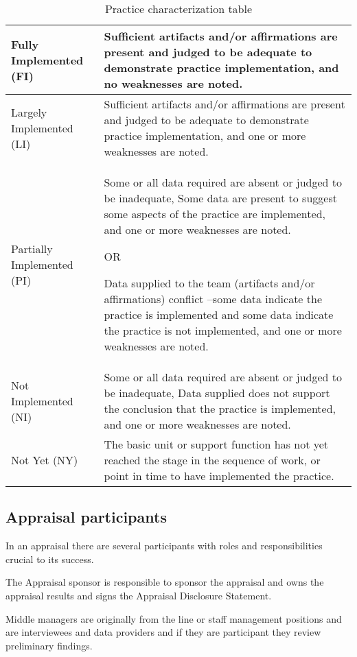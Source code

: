 \begin{table}[h]
	\centering
	\caption{Practice characterization table}
\begin{tabular}{|p{4cm}|p{9cm}|}
\hline
Fully Implemented (FI)   & Sufficient artifacts and/or affirmations are present and
judged to be adequate to demonstrate practice implementation, and
no weaknesses are noted.    \\
\hline
Largely Implemented (LI) & Sufficient artifacts and/or affirmations are present and
judged to be adequate to demonstrate practice implementation, and
one or more weaknesses are noted.  \\ 
\hline
Partially Implemented (PI) & Some or all data required are absent or judged to be
inadequate,
Some data are present to suggest some aspects of the practice are
implemented, and
one or more weaknesses are noted.


OR


Data supplied to the team (artifacts and/or affirmations) conflict –some data
indicate the practice is implemented and some data indicate the practice is
not implemented, and
one or more weaknesses are noted.\\
\hline
Not Implemented (NI) & Some or all data required are absent or judged to be
inadequate,
Data supplied does not support the conclusion that the practice is
implemented, and
one or more weaknesses are noted. \\
\hline
Not Yet (NY) & The basic unit or support function has not yet reached the stage in the
sequence of work, or point in time to have implemented the practice. \\
\hline
\end{tabular}
\label{tab:characterizations}
\end{table}





\subsection{Appraisal participants}
In an appraisal there are several participants with roles and responsibilities crucial to its success.

The Appraisal sponsor is responsible to sponsor the appraisal and owns the appraisal results and signs the Appraisal Disclosure Statement.

Middle managers are originally from the line or staff management positions and are interviewees and data providers and if they are participant they review preliminary findings.


